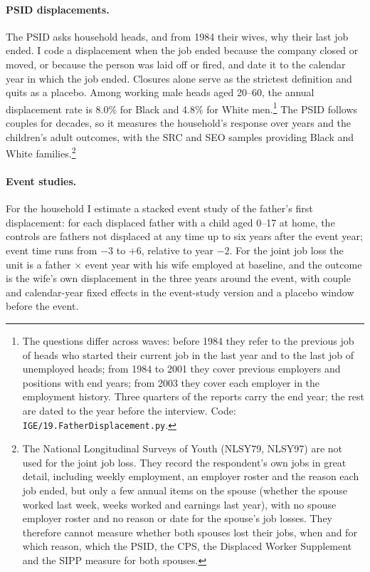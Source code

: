 \paragraph{PSID displacements.} The PSID asks household heads, and from 1984 their wives, why their last job ended. I
code a displacement when the job ended because the company closed or moved, or because the person was laid off or
fired, and date it to the calendar year in which the job ended. Closures alone serve as the strictest definition and
quits as a placebo. Among working male heads aged 20--60, the annual displacement rate is 8.0\% for Black and 4.8\%
for White men.\footnote{The questions differ across waves: before 1984 they refer to the previous job of heads who
started their current job in the last year and to the last job of unemployed heads; from 1984 to 2001 they cover
previous employers and positions with end years; from 2003 they cover each employer in the employment history. Three
quarters of the reports carry the end year; the rest are dated to the year before the interview. Code:
\texttt{IGE/19.FatherDisplacement.py}.} The PSID follows couples for decades, so it measures the household's response
over years and the children's adult outcomes, with the SRC and SEO samples providing Black and White families.\footnote{The
National Longitudinal Surveys of Youth (NLSY79, NLSY97) are not used for the joint job loss. They record the
respondent's own jobs in great detail, including weekly employment, an employer roster and the reason each job ended,
but only a few annual items on the spouse (whether the spouse worked last week, weeks worked and earnings last year),
with no spouse employer roster and no reason or date for the spouse's job losses. They therefore cannot measure whether
both spouses lost their jobs, when and for which reason, which the PSID, the CPS, the Displaced Worker Supplement and
the SIPP measure for both spouses.}

\paragraph{Event studies.} For the household I estimate a stacked event study of the father's first displacement: for
each displaced father with a child aged 0--17 at home, the controls are fathers not displaced at any time up to six
years after the event year; event time runs from $-3$ to $+6$, relative to year $-2$. For the joint job loss the unit is
a father $\times$ event year with his wife employed at baseline, and the outcome is the wife's own displacement in the
three years around the event, with couple and calendar-year fixed effects in the event-study version and a placebo
window before the event.

